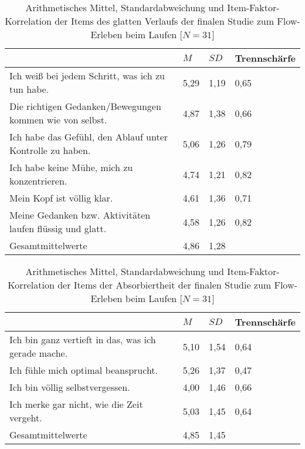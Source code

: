 \begin{table}
	[!htb] \centering \caption[Item-Faktor-Korrelation der Items des glatten Verlaufs (Finale Studie: Laufen)]{Arithmetisches Mittel, Standardabweichung und Item-Faktor-Korrelation der Items des glatten Verlaufs der finalen Studie zum Flow-Erleben beim Laufen [$N = 31$]} \label{tab:glatter_verlauf_3} 
	\begin{tabularx}
		{ 
		\textwidth}{p{} p{} p{} p{}} \toprule & $M$ & $SD$ & Trennschärfe \\
		\midrule Ich weiß bei jedem Schritt, was ich zu tun habe. & 5,29 & 1,19 & 0,65 \\
		Die richtigen Gedanken/Bewegungen kommen wie von selbst. & 4,87 & 1,38 & 0,66 \\
		Ich habe das Gefühl, den Ablauf unter Kontrolle zu haben. & 5,06 & 1,26 & 0,79 \\
		Ich habe keine Mühe, mich zu konzentrieren. & 4,74 & 1,21 & 0,82 \\
		Mein Kopf ist völlig klar. & 4,61 & 1,36 & 0,71 \\
		Meine Gedanken bzw. Aktivitäten laufen flüssig und glatt. & 4,58 & 1,26 & 0,82 \\
		Gesamtmittelwerte & 4,86 & 1,28 & \\
		\bottomrule 
	\end{tabularx}
\end{table}
\begin{table}
	[!htb] \centering \caption[Item-Faktor-Korrelation der Items der Absorbiertheit (Finale Studie: Laufen)]{Arithmetisches Mittel, Standardabweichung und Item-Faktor-Korrelation der Items der Absorbiertheit der finalen Studie zum Flow-Erleben beim Laufen [$N = 31$]} \label{tab:absorbiertheit_3} 
	\begin{tabularx}
		{ 
		\textwidth}{p{} p{} p{} p{}} \toprule & $M$ & $SD$ & Trennschärfe \\
		\midrule Ich bin ganz vertieft in das, was ich gerade mache. & 5,10 & 1,54 & 0,64 \\
		Ich fühle mich optimal beansprucht. & 5,26 & 1,37 & 0,47 \\
		Ich bin völlig selbstvergessen. & 4,00 & 1,46 & 0,66 \\
		Ich merke gar nicht, wie die Zeit vergeht. & 5,03 & 1,45 & 0,64 \\
		Gesamtmittelwerte & 4,85 & 1,45 & \\
		\bottomrule 
	\end{tabularx}
\end{table}

